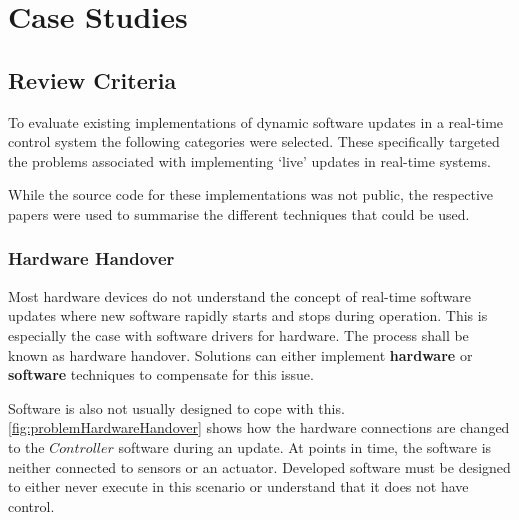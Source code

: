 \section{Case Studies}

\subsection{Review Criteria}
To evaluate existing implementations of dynamic software updates in a real-time control system the following categories were selected. These specifically targeted the problems associated with implementing `live' updates in real-time systems.

While the source code for these implementations was not public, the respective papers were used to summarise the different techniques that could be used.

\subsubsection{Hardware Handover} \label{sec:hardware}

Most hardware devices do not understand the concept of real-time software updates where new software rapidly starts and stops during operation. This is especially the case with software drivers for hardware. The process shall be known as hardware handover. Solutions can either implement \textbf{hardware} or \textbf{software} techniques to compensate for this issue. 

Software is also not usually designed to cope with this. \autoref{fig:problemHardwareHandover} shows how the hardware connections are changed to the $Controller$ software during an update. At points in time, the software is neither connected to sensors or an actuator. Developed software must be designed to either never execute in this scenario or understand that it does not have control.

